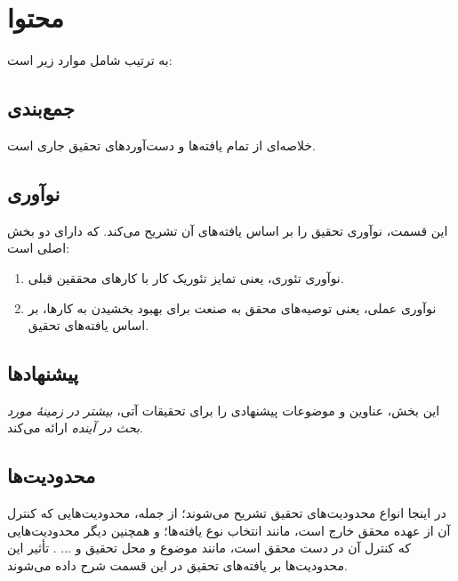 \section{محتوا}
به ترتیب شامل موارد زیر است:

\subsection{جمع‌بندی}
خلاصه‌ای از تمام یافته‌ها و دست‌آوردهای تحقیق جاری است.

\subsection{نوآوری}
این قسمت، نوآوری تحقیق را بر اساس یافته‌های آن تشریح می‌کند. که دارای دو بخش اصلی است:
\begin{enumerate}
	\item
	نوآوری تئوری، یعنی تمایز تئوریک کار با کارهای محققین قبلی.
	\item
	نوآوری عملی، یعنی توصیه‌های محقق به صنعت برای بهبود بخشیدن به کارها، بر اساس یافته‌های تحقیق.
\end{enumerate}

\subsection{پیشنهادها}
این بخش، عناوین و موضوعات پیشنهادی را برای تحقیقات آتی،
\emph{بیشتر در زمینهٔ مورد بحث در آینده}
ارائه می‌کند.

\subsection{محدودیت‌ها}
در اینجا انواع محدودیت‌های تحقیق تشریح می‌شوند؛ از جمله، محدودیت‌هایی که کنترل آن از عهده محقق خارج است، مانند انتخاب نوع یافته‌ها؛ و همچنین دیگر محدودیت‌هایی که کنترل آن در دست محقق است، مانند موضوع و محل تحقیق و ... . تأثیر این محدودیت‌ها بر یافته‌های تحقیق در این قسمت شرح داده می‌شوند.